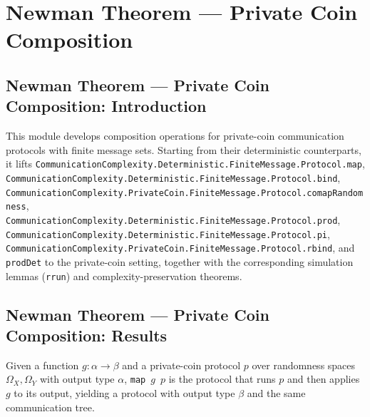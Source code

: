 \section{Newman Theorem --- Private Coin Composition}
\subsection*{Newman Theorem --- Private Coin Composition: Introduction}

This module develops composition operations for private-coin communication protocols
with finite message sets.  Starting from their deterministic counterparts, it lifts
\texttt{CommunicationComplexity.Deterministic.FiniteMessage.Protocol.map}, \texttt{CommunicationComplexity.Deterministic.FiniteMessage.Protocol.bind}, \texttt{CommunicationComplexity.PrivateCoin.FiniteMessage.Protocol.comapRandomness}, \texttt{CommunicationComplexity.Deterministic.FiniteMessage.Protocol.prod}, \texttt{CommunicationComplexity.Deterministic.FiniteMessage.Protocol.pi}, \texttt{CommunicationComplexity.PrivateCoin.FiniteMessage.Protocol.rbind},
and \texttt{prodDet} to the private-coin setting, together with the corresponding
simulation lemmas (\texttt{rrun}) and complexity-preservation theorems.

\subsection*{Newman Theorem --- Private Coin Composition: Results}

\begin{definition}
\label{CommunicationComplexity.PrivateCoin.FiniteMessage.Protocol.map}
\leanok
{}
Given a function $g : \alpha \to \beta$ and a private-coin protocol $p$ over randomness
spaces $\Omega_X, \Omega_Y$ with output type $\alpha$, \texttt{map}~$g$~$p$ is the
protocol that runs $p$ and then applies $g$ to its output, yielding a protocol with
output type $\beta$ and the same communication tree.
\end{definition}

